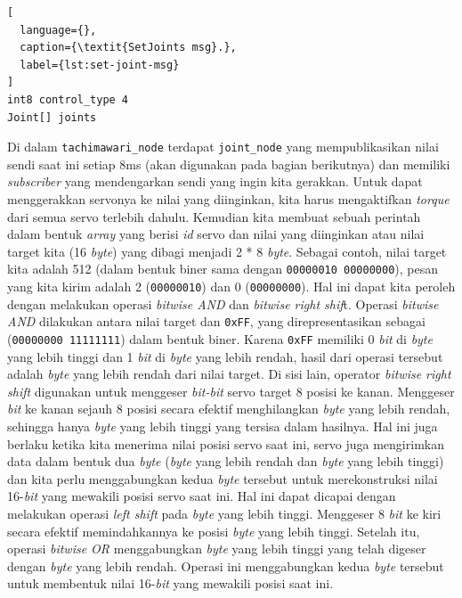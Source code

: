\begin{lstlisting}[
  language={},
  caption={\textit{SetJoints msg}.},
  label={lst:set-joint-msg}
]
int8 control_type 4
Joint[] joints
\end{lstlisting}

Di dalam \verb|tachimawari_node| terdapat \verb|joint_node| yang mempublikasikan nilai sendi saat ini setiap 8ms (akan digunakan pada bagian berikutnya) dan memiliki \emph{subscriber} yang mendengarkan sendi yang ingin kita gerakkan.
Untuk dapat menggerakkan servonya ke nilai yang diinginkan, kita harus mengaktifkan \emph{torque} dari semua servo terlebih dahulu. Kemudian kita membuat sebuah perintah dalam bentuk \textit{array} yang berisi \textit{id} servo dan nilai yang diinginkan atau nilai target kita (16 \textit{byte}) yang dibagi menjadi 2 * 8 \textit{byte}.
Sebagai contoh, nilai target kita adalah 512 (dalam bentuk biner sama dengan \verb|00000010 00000000|), pesan yang kita kirim adalah 2 (\verb|00000010|) dan 0 (\verb|00000000|). Hal ini dapat kita peroleh dengan melakukan operasi \textit{bitwise AND} dan \textit{bitwise right shif}t. Operasi \textit{bitwise AND} dilakukan antara nilai target dan \verb|0xFF|, yang direpresentasikan sebagai (\verb|00000000 11111111|) dalam bentuk biner.
Karena \verb|0xFF| memiliki 0 \textit{bit} di \textit{byte} yang lebih tinggi dan 1 \textit{bit} di \textit{byte} yang lebih rendah, hasil dari operasi tersebut adalah \textit{byte} yang lebih rendah dari nilai target. Di sisi lain, operator \textit{bitwise right shift} digunakan untuk menggeser \textit{bit-bit} servo target 8 posisi ke kanan. Menggeser \textit{bit} ke kanan sejauh 8 posisi secara efektif menghilangkan \textit{byte} yang lebih rendah, sehingga hanya \textit{byte} yang lebih tinggi yang tersisa dalam hasilnya.
Hal ini juga berlaku ketika kita menerima nilai posisi servo saat ini, servo juga mengirimkan data dalam bentuk dua \textit{byte} (\textit{byte} yang lebih rendah dan \textit{byte} yang lebih tinggi) dan kita perlu menggabungkan kedua \textit{byte} tersebut untuk merekonstruksi nilai 16-\textit{bit} yang mewakili posisi servo saat ini. Hal ini dapat dicapai dengan melakukan operasi \textit{left shift} pada \textit{byte} yang lebih tinggi.
Menggeser 8 \textit{bit} ke kiri secara efektif memindahkannya ke posisi \textit{byte} yang lebih tinggi. Setelah itu, operasi \textit{bitwise OR} menggabungkan \textit{byte} yang lebih tinggi yang telah digeser dengan \textit{byte} yang lebih rendah. Operasi ini menggabungkan kedua \textit{byte} tersebut untuk membentuk nilai 16-\textit{bit} yang mewakili posisi saat ini.


